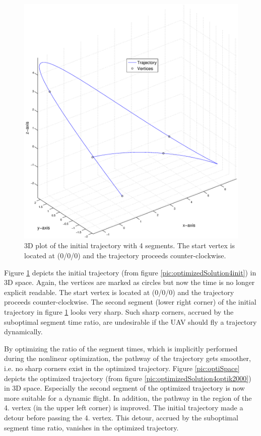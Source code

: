 \begin{figure}[H]
   \centering
   \includegraphics[trim = 36mm 30mm 33mm 30mm,clip,width=1\textwidth]{pics/4SegInitSpace.eps}
   \caption{3D plot of the initial trajectory with 4 segments. The start vertex is located at (0/0/0) and the trajectory proceeds counter-clockwise.}
   \label{pic:initiSpace} 
\end{figure}


Figure \ref{pic:initiSpace} depicts the initial trajectory (from figure \ref{pic:optimizedSolution4init}) in 3D space. Again, the vertices are marked as circles but now the time is no longer explicit readable. The start vertex is located at (0/0/0) and the trajectory proceeds counter-clockwise. The second segment (lower right corner) of the initial trajectory in figure \ref{pic:initiSpace} looks very sharp. Such sharp corners, accrued by the suboptimal segment time ratio, are undesirable if the UAV should fly a trajectory dynamically. \newline

By optimizing the ratio of the segment times, which is implicitly performed during the nonlinear optimization, the pathway of the trajectory gets smoother, i.e. no sharp corners exist in the optimized trajectory.\newline 
Figure \ref{pic:optiSpace} depicts the optimized trajectory (from figure \ref{pic:optimizedSolution4optik2000}) in 3D space. Especially the second segment of the optimized trajectory is now more suitable for a dynamic flight. In addition, the pathway in the region of the 4. vertex (in the upper left corner) is improved. The initial trajectory made a detour before passing the 4. vertex. This detour, accrued by the suboptimal segment time ratio, vanishes in the optimized trajectory.



